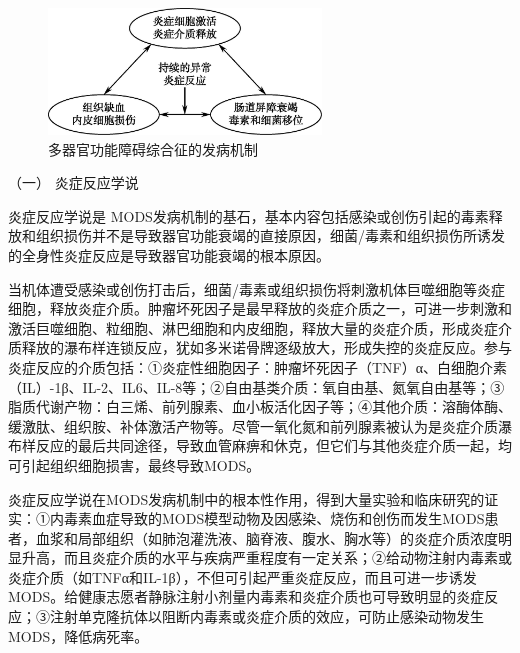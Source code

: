 \begin{figure}[!htbp]
 \centering
 \includegraphics[width=2.85417in,height=1.32292in]{./images/Image00133.jpg}
 \captionsetup{justification=centering}
 \caption{多器官功能障碍综合征的发病机制}
 \label{fig35-2}
  \end{figure} 

\hypertarget{text00093.htmlux5cux23CHP3-11-2-2-1}{}
（一） 炎症反应学说

炎症反应学说是
MODS发病机制的基石，基本内容包括感染或创伤引起的毒素释放和组织损伤并不是导致器官功能衰竭的直接原因，细菌/毒素和组织损伤所诱发的全身性炎症反应是导致器官功能衰竭的根本原因。

当机体遭受感染或创伤打击后，细菌/毒素或组织损伤将刺激机体巨噬细胞等炎症细胞，释放炎症介质。肿瘤坏死因子是最早释放的炎症介质之一，可进一步刺激和激活巨噬细胞、粒细胞、淋巴细胞和内皮细胞，释放大量的炎症介质，形成炎症介质释放的瀑布样连锁反应，犹如多米诺骨牌逐级放大，形成失控的炎症反应。参与炎症反应的介质包括：①炎症性细胞因子：肿瘤坏死因子（TNF）α、白细胞介素（IL）-1β、IL-2、IL6、IL-8等；②自由基类介质：氧自由基、氮氧自由基等；③脂质代谢产物：白三烯、前列腺素、血小板活化因子等；④其他介质：溶酶体酶、缓激肽、组织胺、补体激活产物等。尽管一氧化氮和前列腺素被认为是炎症介质瀑布样反应的最后共同途径，导致血管麻痹和休克，但它们与其他炎症介质一起，均可引起组织细胞损害，最终导致MODS。

炎症反应学说在MODS发病机制中的根本性作用，得到大量实验和临床研究的证实：①内毒素血症导致的MODS模型动物及因感染、烧伤和创伤而发生MODS患者，血浆和局部组织（如肺泡灌洗液、脑脊液、腹水、胸水等）的炎症介质浓度明显升高，而且炎症介质的水平与疾病严重程度有一定关系；②给动物注射内毒素或炎症介质（如TNFα和IL-1β），不但可引起严重炎症反应，而且可进一步诱发MODS。给健康志愿者静脉注射小剂量内毒素和炎症介质也可导致明显的炎症反应；③注射单克隆抗体以阻断内毒素或炎症介质的效应，可防止感染动物发生MODS，降低病死率。

